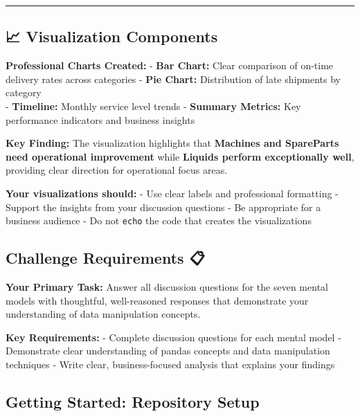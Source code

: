 \documentclass[
  letterpaper,
  DIV=11,
  numbers=noendperiod]{scrartcl}
\begin{document}
\begin{center}\rule{0.5\linewidth}{0.5pt}\end{center}

\subsection{\texorpdfstring{📈 \textbf{Visualization
Components}}{📈 Visualization Components}}\label{visualization-components}

\textbf{Professional Charts Created:} - \textbf{Bar Chart:} Clear
comparison of on-time delivery rates across categories - \textbf{Pie
Chart:} Distribution of late shipments by category\\
- \textbf{Timeline:} Monthly service level trends - \textbf{Summary
Metrics:} Key performance indicators and business insights

\textbf{Key Finding:} The visualization highlights that \textbf{Machines
and SpareParts need operational improvement} while \textbf{Liquids
perform exceptionally well}, providing clear direction for operational
focus areas.

\textbf{Your visualizations should:} - Use clear labels and professional
formatting - Support the insights from your discussion questions - Be
appropriate for a business audience - Do not \texttt{echo} the code that
creates the visualizations

\subsection{Challenge Requirements 📋}\label{challenge-requirements}

\textbf{Your Primary Task:} Answer all discussion questions for the
seven mental models with thoughtful, well-reasoned responses that
demonstrate your understanding of data manipulation concepts.

\textbf{Key Requirements:} - Complete discussion questions for each
mental model - Demonstrate clear understanding of pandas concepts and
data manipulation techniques - Write clear, business-focused analysis
that explains your findings

\subsection{Getting Started: Repository Setup
🚀}\label{getting-started-repository-setup}
\end{document}
